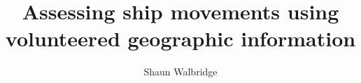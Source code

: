 \documentclass[12pt,letterpaper]{article}
\begin{document}
\title{\Huge{Assessing ship movements using volunteered geographic information}}
\author{Shaun Walbridge}
\maketitle{}


%















%

\end{document}
